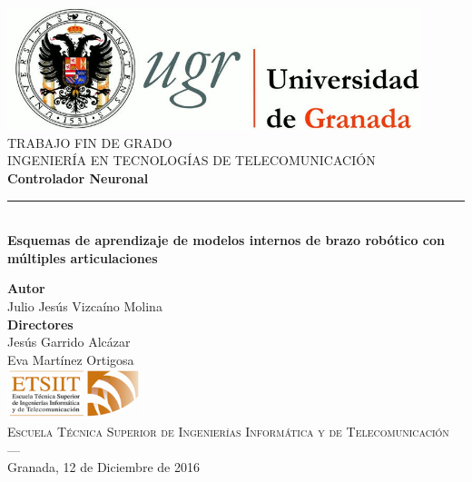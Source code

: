 \begin{titlepage}
 
 
\newlength{\centeroffset}
\setlength{\centeroffset}{-0.5\oddsidemargin}
\addtolength{\centeroffset}{0.5\evensidemargin}
\thispagestyle{empty}

\noindent\hspace*{\centeroffset}\begin{minipage}{\textwidth}

\centering
\includegraphics[width=0.9\textwidth]{imagenes/logo_ugr.jpg}\\[1.4cm]

\textsc{ \Large TRABAJO FIN DE GRADO\\[0.2cm]}
\textsc{ INGENIERÍA EN TECNOLOGÍAS DE TELECOMUNICACIÓN}\\[1cm]
% 
{\Huge\bfseries Controlador Neuronal\\
}
\noindent\rule[-1ex]{\textwidth}{3pt}\\[3.5ex]
{\large\bfseries Esquemas de aprendizaje de modelos internos de brazo robótico con múltiples articulaciones}
\end{minipage}

\vspace{2.5cm}
\noindent\hspace*{\centeroffset}\begin{minipage}{\textwidth}
\centering

\textbf{Autor}\\ {Julio Jesús Vizcaíno Molina}\\[2.5ex]
\textbf{Directores}\\
{Jesús Garrido Alcázar\\
Eva Martínez Ortigosa}\\[2cm]
\includegraphics[width=0.3\textwidth]{imagenes/etsiit_logo.png}\\[0.1cm]
\textsc{Escuela Técnica Superior de Ingenierías Informática y de Telecomunicación}\\
\textsc{---}\\
Granada, 12 de Diciembre de 2016
\end{minipage}
\end{titlepage}

